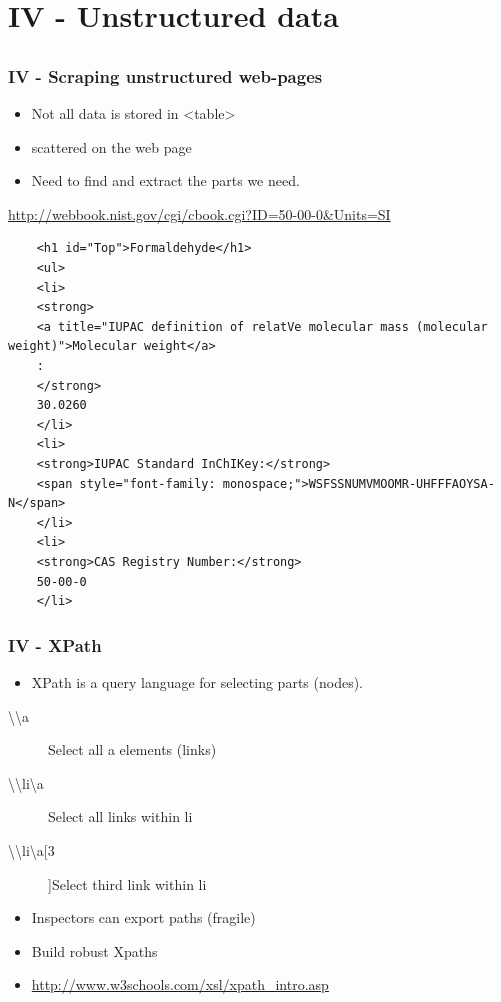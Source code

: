\documentclass[12pt, t]{beamer}
\begin{document}
\section{IV - Unstructured data}
\subsection{}
\begin{frame}[fragile]
\frametitle{IV - Scraping unstructured web-pages}
\begin{itemize}
	\item Not all data is stored in <table>
	\item scattered on the web page
	\item Need to find and extract the parts we need.
\end{itemize}

\tiny
\url{http://webbook.nist.gov/cgi/cbook.cgi?ID=50-00-0&Units=SI}

	\begin{verbatim}
	<h1 id="Top">Formaldehyde</h1>
	<ul>
	<li>
	<strong>
	<a title="IUPAC definition of relatVe molecular mass (molecular weight)">Molecular weight</a>
	:
	</strong>
	30.0260
	</li>
	<li>
	<strong>IUPAC Standard InChIKey:</strong>
	<span style="font-family: monospace;">WSFSSNUMVMOOMR-UHFFFAOYSA-N</span>
	</li>
	<li>
	<strong>CAS Registry Number:</strong>
	50-00-0
	</li>
	\end{verbatim}
\end{frame}


\begin{frame}[fragile]
\frametitle{IV - XPath}
\begin{itemize}
  \item XPath is a query language for selecting parts (nodes).
\end{itemize}

\begin{description}
  \item[\textbackslash\textbackslash a]{Select all a elements (links)}
  \item[\textbackslash\textbackslash li\textbackslash a]{Select all links within li}
  \item[\textbackslash\textbackslash li\textbackslash a[3]]{Select third link within li}
\end{description}


\begin{itemize}
  \item Inspectors can export paths (fragile)
  \item Build \textcolor{hilight}{robust} Xpaths
  \item \url{http://www.w3schools.com/xsl/xpath_intro.asp}
\end{itemize}
\end{frame}
\end{document}
